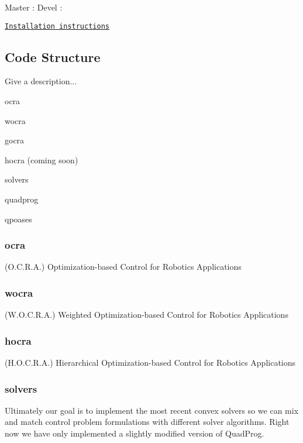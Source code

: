 Master \+: \href{https://travis-ci.org/ocra-recipes/ocra-recipes}{\tt } Devel \+: \href{https://travis-ci.org/ocra-recipes/ocra-recipes}{\tt }

\href{#Installation}{\tt Installation instructions}

\subsection*{Code Structure}

Give a description...


\begin{DoxyItemize}
\item ocra
\item wocra
\item gocra
\item hocra (coming soon)
\item solvers
\begin{DoxyItemize}
\item quadprog
\item qpoases
\end{DoxyItemize}
\end{DoxyItemize}

\subsubsection*{ocra}

(O.\+C.\+R.\+A.) Optimization-\/based Control for Robotics Applications

\subsubsection*{wocra}

(W.\+O.\+C.\+R.\+A.) Weighted Optimization-\/based Control for Robotics Applications

\subsubsection*{hocra}

(H.\+O.\+C.\+R.\+A.) Hierarchical Optimization-\/based Control for Robotics Applications

\subsubsection*{solvers}

Ultimately our goal is to implement the most recent convex solvers so we can mix and match control problem formulations with different solver algorithms. Right now we have only implemented a slightly modified version of Quad\+Prog.

